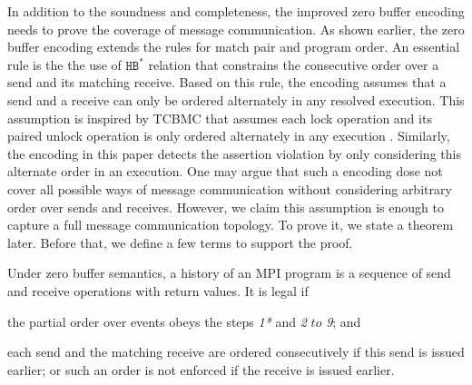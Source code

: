 
In addition to the soundness and completeness, the improved zero buffer encoding needs to prove the coverage of message communication. As shown earlier, the zero buffer encoding extends the rules for match pair and program order. An essential rule is the the use of $\mathtt{HB^*}$ relation that constrains the consecutive order over a send and its matching receive. Based on this rule, the encoding assumes that a send and a receive can only be ordered alternately in any resolved execution. This assumption is inspired by TCBMC that assumes each lock operation and its paired unlock  operation is only ordered alternately in any execution \cite{DBLP:conf/cav/RabinovitzG05}. Similarly, the encoding in this paper detects the assertion violation by only considering this alternate order in an execution. One may argue that such a encoding dose not cover all possible ways of message communication without considering arbitrary order over sends and receives. However, we claim this assumption is enough to capture a full message communication topology. To prove it, we state a theorem later.  Before that, we define a few terms to support the proof.

\begin{definition}\label{def:legal}
Under zero buffer semantics, a history of an MPI program is a sequence of send and receive operations with return values. It is legal if
\begin{compactenum}
\item the partial order over events obeys the steps \textit{1*} and \textit{2} $to$ \textit{9}; and 
\item each send and the matching receive are ordered consecutively if this send is issued earlier; or such an order is not enforced if the receive is issued earlier.
\end{compactenum}
\end{definition}

